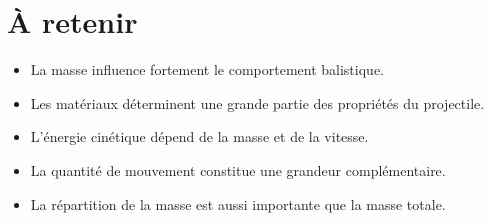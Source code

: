 \section{À retenir}

\begin{aretenir}

\begin{itemize}
    \item La masse influence fortement le comportement balistique.
    \item Les matériaux déterminent une grande partie des propriétés du
    projectile.
    \item L'énergie cinétique dépend de la masse et de la vitesse.
    \item La quantité de mouvement constitue une grandeur complémentaire.
    \item La répartition de la masse est aussi importante que la masse totale.
\end{itemize}

\end{aretenir}
